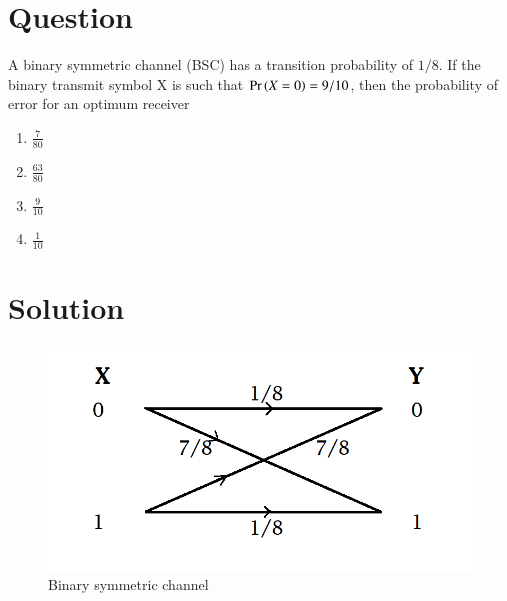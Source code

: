 \documentclass[journal,12pt,twocolumn]{IEEEtran}
\begin{document}
\section*{Question}
A binary symmetric channel (BSC) has a transition probability of $1/8$. If the binary transmit symbol X is such that $\Pr\left(X = 0\right) = 9/10$, then the probability of error for an optimum receiver
\begin{enumerate}[label=\Alph*)]
    \item $\frac{7}{80}$
    \item $\frac{63}{80}$
    \item $\frac{9}{10}$
    \item $\frac{1}{10}$
\end{enumerate}
\section*{Solution}

\begin{figure}[h!]
\centering
\includegraphics[width=\columnwidth]{Figure.png}
\caption{Binary symmetric channel}
\label{fig:BSC}
\end{figure}
\end{document}
